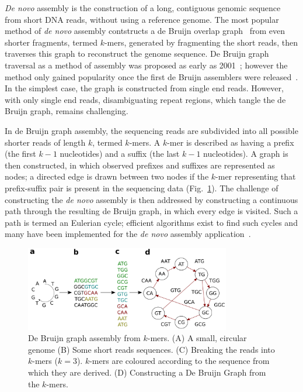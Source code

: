 \textit{De novo} assembly is the construction of a long, contiguous genomic sequence from short DNA reads, without using a reference genome. The most popular method of \textit{de novo} assembly contstructs a de Bruijn overlap graph~\cite{Compeau2011} from even shorter fragments, termed $k$-mers, generated by fragmenting the short reads, then traverses this graph to reconstruct the genome sequence. De Bruijn graph traversal as a method of assembly was proposed as early as 2001~\cite{Pevzner2001}; however the method only gained popularity once the first de Bruijn assemblers were released~\cite{Zerbino2008}. In the simplest case, the graph is constructed from single end reads. However, with only single end reads, disambiguating repeat regions, which tangle the de Bruijn graph, remains challenging. 

In de Bruijn graph assembly, the sequencing reads are subdivided into all possible shorter reads of length $k$, termed $k$-mers. A $k$-mer is described as having a prefix (the first $k - 1$ nucleotides) and a suffix (the last $k - 1$ nucleotides). A graph is then constructed, in which observed prefixes and suffixes are represented as nodes; a directed edge is drawn between two nodes if the $k$-mer representing that prefix-suffix pair is present in the sequencing data (Fig.~\ref{fig:de-bruijn}). The challenge of constructing the \textit{de novo} assembly is then addressed by constructing a continuous path through the resulting de Bruijn graph, in which every edge is visited. Such a path is termed an Eulerian cycle; efficient algorithms exist to find such cycles and many have been implemented for the \textit{de novo} assembly application~\cite{Zerbino2008, Bankevich2012, Li2010_SOAP}. 

\begin{figure}
\centerline{\includegraphics[width=0.8\textwidth]{illumina/de_bruijn.pdf}}
\caption{De Bruijn graph assembly from $k$-mers. (A) A small, circular genome (B) Some short reads sequences. (C) Breaking the reads into $k$-mers ($k = 3$). $k$-mers are coloured according to the sequence from which they are derived. (D) Constructing a De Bruijn Graph from the $k$-mers.}
\label{fig:de-bruijn}
\end{figure}

